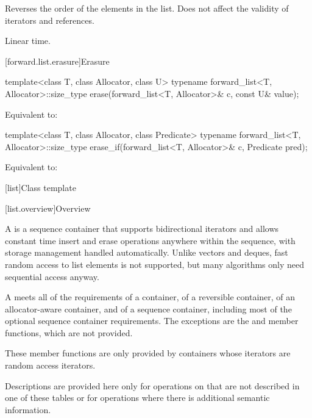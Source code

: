 \begin{itemdescr}
\pnum
\effects
Reverses the order of the elements in the list.
Does not affect the validity of iterators and references.

\pnum
\complexity
Linear time.
\end{itemdescr}

[forward.list.erasure]{Erasure}

%
\begin{itemdecl}
template<class T, class Allocator, class U>
  typename forward_list<T, Allocator>::size_type
    erase(forward_list<T, Allocator>& c, const U& value);
\end{itemdecl}

\begin{itemdescr}
\pnum
\effects
Equivalent to: 
\end{itemdescr}

%
\begin{itemdecl}
template<class T, class Allocator, class Predicate>
  typename forward_list<T, Allocator>::size_type
    erase_if(forward_list<T, Allocator>& c, Predicate pred);
\end{itemdecl}

\begin{itemdescr}
\pnum
\effects
Equivalent to: 
\end{itemdescr}

[list]{Class template }

[list.overview]{Overview}

\pnum
{}%
A
is a sequence container that supports
bidirectional iterators and allows constant time insert and erase
operations anywhere within the sequence, with storage management handled
automatically. Unlike vectors and deques,
fast random access to list elements is not supported, but many
algorithms only need sequential access anyway.

\pnum
A  meets all of the requirements
of a container,
of a reversible container,
of an allocator-aware container, and
of a sequence container,
including most of the optional sequence container
requirements.
The exceptions are the
and
member functions, which are not provided.
\begin{footnote}
These member functions
are only provided by containers whose iterators
are random access iterators.
\end{footnote}
Descriptions are provided here only for operations on
that are not described in one of these tables
or for operations where there is additional semantic information.

